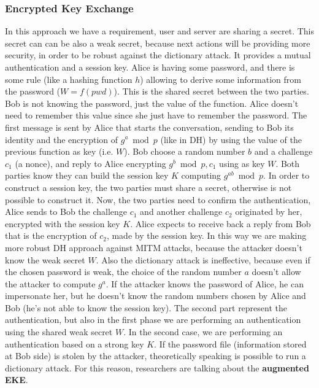 \documentclass[11pt]{article}
\begin{document}
\subsubsection{Encrypted Key Exchange}
In this approach we have a requirement, user and server are sharing a secret. This secret can can be also a weak secret, because next actions will be providing more security, in order to be robust against the dictionary attack. It provides a mutual authentication and a session key. Alice is having some password, and there is some rule (like a hashing function $h$) allowing to derive some information from the password ($W = f(pwd)$). This is the shared secret between the two parties. Bob is not knowing the password, just the value of the function. Alice doesn't need to remember this value since she just have to remember the password. The first message is sent by Alice that starts the conversation, sending to Bob its identity and the encryption of $g^a \bmod p$ (like in DH) by using the value of the previous function as key (i.e. $W$). Bob choose a random number $b$ and a challenge $c_1$ (a nonce), and reply to Alice encrypting $g^b \bmod p, c_1$ using as key $W$. Both parties know they can build the session key $K$ computing $g^{ab} \bmod p$. In order to construct a session key, the two parties must share a secret, otherwise is not possible to construct it. Now, the two parties need to confirm the authentication, Alice sends to Bob the challenge $c_1$ and another challenge $c_2$ originated by her, encrypted with the session key $K$. Alice expects to receive back a reply from Bob that is the encryption of $c_2$, made by the session key. In this way we are making more robust DH approach against MITM attacks, because the attacker doesn't know the weak secret $W$. Also the dictionary attack is ineffective, because even if the chosen password is weak, the choice of the random number $a$ doesn't allow the attacker to compute $g^a$. If the attacker knows the password of Alice, he can impersonate her, but he doesn't know the random numbers chosen by Alice and Bob (he's not able to know the session key). The second part represent the authentication, but also in the first phase we are performing an authentication using the shared weak secret $W$. In the second case, we are performing an authentication based on a strong key $K$. If the password file (information stored at Bob side) is stolen by the attacker, theoretically speaking is possible to run a dictionary attack. For this reason, researchers are talking about the \textbf{augmented EKE}. 
\end{document}
